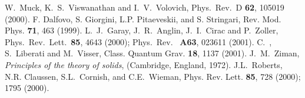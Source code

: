 \documentclass[a4paper,prl,showpacs,twocolumn]{revtex4}
\begin{document}
\begin{thebibliography}{99}
W.~Muck, K.~S.~Viswanathan and I.~V.~Volovich,
Phys.\ Rev.\ D {\bf 62}, 105019 (2000).
F. Dalfovo, S. Giorgini, L.P. Pitaeveskii, and S. Stringari,
Rev. Mod. Phys. {\bf 71}, 463 (1999).
L.~J.~Garay, J.~R.~Anglin, J.~I.~Cirac and P.~Zoller,
Phys.~Rev.~Lett.~{\bf 85}, 4643 (2000);
Phys.~Rev.~ {\bf A63}, 023611 (2001).
C.~\Barcelo, S.~Liberati and M.~Visser,
Class. Quantum Grav. {\bf 18}, 1137 (2001).
J.~M.~Ziman,
{\sl Principles of the theory of solids},
(Cambridge, England, 1972).
J.L.~Roberts, N.R. Claussen, S.L.~Cornish, and C.E.~Wieman, 
Phys. Rev. Lett. {\bf 85}, 728 (2000); 1795 (2000).

\end{thebibliography}
\end{document}
